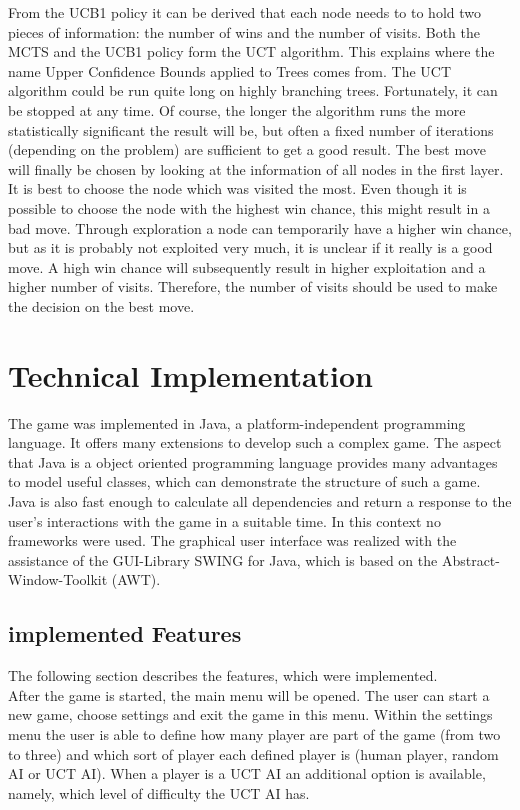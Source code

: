 \documentclass[english]{report} \usepackage[english]{babel}
\begin{document}
From the UCB1 policy it can be derived that each node needs to to hold two
pieces of information: the number of wins and the number of visits.
Both the MCTS and the UCB1 policy form the UCT algorithm. This explains where
the name Upper Confidence Bounds applied to Trees comes from. The UCT algorithm
could be run quite long on highly branching trees. Fortunately, it can be
stopped at any time. Of course, the longer the algorithm runs the more
statistically significant the result will be, but often a fixed number of
iterations (depending on the problem) are sufficient to get a good result.
The best move will finally be chosen by looking at the information of all nodes
in the first layer. It is best to choose the node which was visited the most.
Even though it is possible to choose the node with the highest win chance, this
might result in a bad move. Through exploration a node can temporarily have a
higher win chance, but as it is probably not exploited very much, it is unclear
if it really is a good move. A high win chance will subsequently result in
higher exploitation and a higher number of visits. Therefore, the number of
visits should be used to make the decision on the best move.


\chapter{Technical Implementation}
\label{sec:technImplementation}
The game was implemented in Java, a platform-independent programming language.
It offers many extensions to develop such a complex game. The aspect that Java
is a object oriented programming language provides many advantages to model
useful classes, which can demonstrate the structure of such a game. Java is also
fast enough to calculate all dependencies and return a
response to the user's interactions with the game in a suitable time. In this
context no frameworks were used. The graphical user interface was realized with
the assistance of the GUI-Library SWING for Java, which is based on the
Abstract-Window-Toolkit (AWT).
\section{implemented Features}
The following section describes the features, which were implemented. \\
After the game is started, the main menu will be opened. The user can start a
new game, choose settings and exit the game in this menu. Within the settings menu
the user is able to define how many player are part of the game (from two to
three) and which sort of player each defined player is (human player, random AI
or UCT AI). When a player is a UCT AI an additional option is available, namely,
which level of difficulty the UCT AI has.
\newpage
\end{document}
